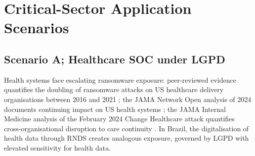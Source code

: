 \documentclass[preprint,12pt,authoryear]{elsarticle}
\begin{document}
\begin{table}[ht]
\centering
\caption{Governance metric set. PIR = Prompt Injection Resistance.}
\label{tab:metrics}
\small
{}%
\end{table}

\section{Critical-Sector Application Scenarios}
\label{sec:scenarios}

\subsection{Scenario A; Healthcare SOC under LGPD}
Health systems face escalating ransomware exposure: peer-reviewed evidence quantifies the doubling of ransomware attacks on US healthcare delivery organisations between 2016 and 2021 \citep{neprash2022ransomware}; the JAMA Network Open analysis of 2024 documents continuing impact on US health systems \citep{jama2024ransomware}; the JAMA Internal Medicine analysis of the February 2024 Change Healthcare attack quantifies cross-organisational disruption to care continuity \citep{neprash2024changehealthcare}. In Brazil, the digitalisation of health data through RNDS creates analogous exposure, governed by LGPD with elevated sensitivity for health data.
\end{document}
